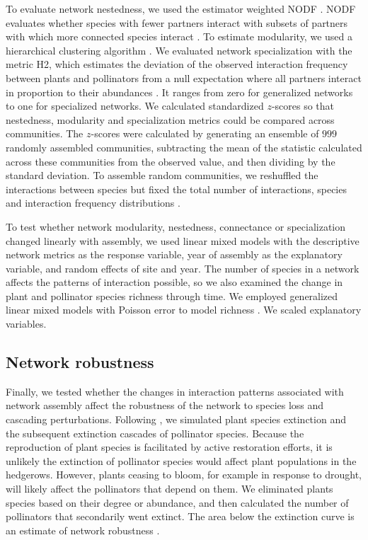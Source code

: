 \documentclass[12pt]{article}
\begin{document}
To evaluate network nestedness, we used the estimator weighted NODF
\citep{almeida-neto-2008-1227}. NODF evaluates whether species with
fewer partners interact with subsets of partners with which more
connected species interact \citep{almeida-neto-2008-1227}. To estimate
modularity, we used a hierarchical clustering algorithm
\citep{Newman2004, csardi-2006}. We evaluated network specialization
with the metric H2, which estimates the deviation of the observed
interaction frequency between plants and pollinators from a null
expectation where all partners interact in proportion to their
abundances \citep{bluthgen-2006-9}. It ranges from zero for
generalized networks to one for specialized networks.  We calculated
standardized $z$-scores so that nestedness, modularity and
specialization metrics could be compared across communities. The
$z$-scores were calculated by generating an ensemble of $999$ randomly
assembled communities, subtracting the mean of the statistic
calculated across these communities from the observed value, and then
dividing by the standard deviation. To assemble random communities, we
reshuffled the interactions between species but fixed the total number
of interactions, species and interaction frequency distributions
\citep{Galeano2009}.

To test whether network modularity, nestedness, connectance or
specialization changed linearly with assembly, we used linear mixed
models with the descriptive network metrics as the response variable,
year of assembly as the explanatory variable, and random effects of
site and year. The number of species in a network affects the patterns
of interaction possible, so we also examined the change in plant and
pollinator species richness through time. We employed generalized
linear mixed models with Poisson error to model richness
\citep{lme4}. We scaled explanatory variables.


\subsection*{Network robustness}
Finally, we tested whether the changes in interaction patterns
associated with network assembly affect the robustness of the network
to species loss and cascading perturbations. Following
\cite{Memmott2004}, we simulated plant species extinction and the
subsequent extinction cascades of pollinator species. Because the
reproduction of plant species is facilitated by active restoration
efforts, it is unlikely the extinction of pollinator species would
affect plant populations in the hedgerows. However, plants ceasing to
bloom, for example in response to drought, will likely affect the
pollinators that depend on them. We eliminated plants species based on
their degree or abundance, and then calculated the number of
pollinators that secondarily went extinct. The area below the
extinction curve is an estimate of network robustness
\citep{Memmott2004, Burgos2007, bipartite}.
\end{document}
